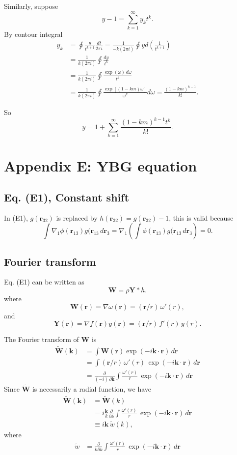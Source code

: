 \documentclass[preprint]{revtex4-1}
\numberwithin{equation}{subsection}
\numberwithin{table}{section}
\newcommand{\vct}[1]{\mathbf{#1}}
\providecommand{\vr}{} %
\renewcommand{\vr}{\vct{r}}
\newcommand{\vk}{\vct{k}}
\begin{document}
Similarly, suppose
\[
  y - 1
=
\sum_{k = 1}^\infty y_k t^k.
\]
By contour integral
\begin{align*}
y_k
&=
\oint \frac{y}{t^{k+1}} \frac{dt}{2\pi i}
=
\frac{1}{-k (2\pi i)} \oint y d\left(\frac{1}{t^{k+1}}\right)
\\
&=
\frac{1}{k (2\pi i)} \oint \frac{ dy }{t^{k}}
\\
&=
\frac{1}{k (2\pi i)} \oint \frac{ \exp(\omega) \, d\omega }{t^{k}}
\\
&=
\frac{1}{k (2\pi i)} \oint \frac{ \exp[(1 - k m) \omega]  }{\omega^{k}} d\omega
=
\frac{ (1-k m)^{k-1} }
     { k! }.
\end{align*}

So
\[
  y
=
1 + \sum_{k = 1}^\infty
\frac{ (1 - k m)^{k-1} t^k } { k! }.
\]




\section{Appendix E: YBG equation}

\subsection{Eq. (E1), Constant shift}

In (E1), $g(\vr_{32})$ is replaced by $h(\vr_{32}) = g(\vr_{32}) - 1$,
this is valid because
\[
 \int \nabla_1 \phi(\vr_{13}) g(\vr_{13} \, d\vr_3
= \nabla_1 \left( \int \phi(\vr_{13}) g(\vr_{13} \, d\vr_3 \right)
= 0.
\]


\subsection{Fourier transform}

Eq. (E1) can be written as
\[
  \vct{W}
=
\rho \vct{Y} * h.
\]
where
\[
  \vct{W}(\vr) = \nabla \omega(\vr) = (\vr/r) \, \omega'(r),
\]
and
\[
  \vct{Y}(\vr) = \nabla f(\vr) y(\vr)
  = (\vr/r) \, f'(r) \, y(r).
\]

The Fourier transform of $\vct W$ is
\begin{align*}
  \tilde{\vct{W}}(\vk)
&=
\int \vct{W}(\vr) \exp(-i\vk\cdot\vr) \, d\vr
\\
&=
\int (\vr/r) \, \omega'(r) \, \exp(-i\vk\cdot\vr) \, d\vr
\\
&=
\frac{\partial}{(-i) \, \partial \vk}
\int \frac{\omega'(r)}{r} \, \exp(-i\vk\cdot\vr) \, d\vr
\end{align*}
%
Since $\tilde{\vct{W}}$ is necessarily a radial function,
we have
\begin{align*}
  \tilde{\vct{W}}(\vk)
&=
  \tilde{\vct{W}}(k)
\\
&=
i \frac{\vk}{k} \frac{\partial}{\partial k}
\int \frac{\omega'(r)}{r} \, \exp(-i\vk\cdot\vr) \, d\vr
\\
&\equiv
i \vk \, \tilde{w}(k),
\end{align*}
where
\begin{align*}
\tilde{w}
&=
\frac{\partial}{k\partial k}
\int \frac{\omega'(r)}{r} \, \exp(-i\vk\cdot\vr) \, d\vr
\end{align*}
\end{document}
